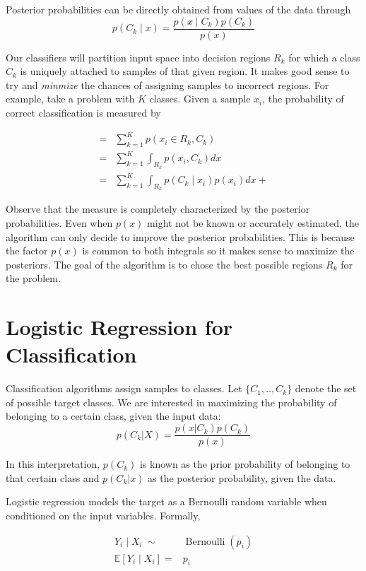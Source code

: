 Posterior probabilities can be directly obtained from values of the data through 
$$p(C_k \mid x) = \frac{p(x \mid C_k)p(C_k)}{p(x)} $$

Our classifiers will partition input space into decision regions $R_k$ for which a class $C_k$ is uniquely attached to samples of that given region. It makes good sense to try and \textit{minmize} the chances of assigning samples to incorrect regions. For example, take a problem with $K$ classes. Given a sample $x_i$, the probability of correct classification is measured by 

\begin{equation}
\begin{split}
=  & \sum_{k=1}^{K} p(x_i \in R_k, C_k )  \\
=  & \sum_{k=1}^{K} \int_{R_k}p(x_i,C_k) dx \\
=  & \sum_{k=1}^{K} \int_{R_k}p(C_k \mid x_i) p(x_i) dx + 
\end{split}
\end{equation}

Observe that the measure is completely characterized by the posterior probabilities. Even when $p(x)$ might not be known or accurately estimated, the algorithm can only decide to improve the posterior probabilities. This is because the factor $p(x)$ is common to both integrals so it makes sense to maximize the posteriors. The goal of the algorithm is to chose the best possible regions $R_k$ for the problem.


\section{Logistic Regression for Classification}

Classification algorithms assign samples to classes. Let $\{C_1,..,C_k\}$ denote the set of possible target classes. We are  interested in maximizing the probability of belonging to a certain class, given the input data:
$$p(C_k| X) = \frac{p(x|C_k)p(C_k)}{p(x)} $$

In this interpretation, $p(C_k)$ is known as the prior probability of belonging to that certain class and $p(C_k|x)$ as the posterior probability, given the data.



Logistic regression models the target as a Bernoulli random variable when conditioned on the input variables. Formally,

\begin{equation}
\begin{split}
Y_i \mid X_i \  \sim & \operatorname{Bernoulli}(p_i) \\
\mathbb{E}[Y_i \mid X_i ] = & p_i  
\end{split}
\end{equation}
	

